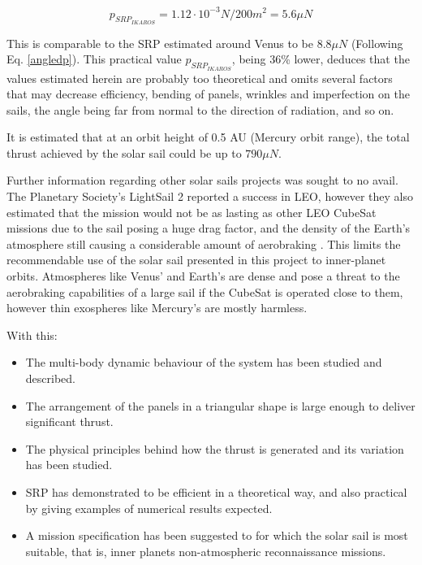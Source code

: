 \begin{equation}\label{Ikarossrp}
    p_{SRP_{IKAROS}} = 1.12 \cdot 10^{-3} N / 200 m^2 = 5.6 \mu N
\end{equation}

This is comparable to the SRP estimated around Venus to be $8.8 \mu N$ (Following Eq. \ref{angledp}). This practical value $p_{SRP_{IKAROS}}$, being 36\% lower, deduces that the values estimated herein are probably too theoretical and omits several factors that may decrease efficiency, bending of panels, wrinkles and imperfection on the sails, the angle being far from normal to the direction of radiation, and so on. 

It is estimated that at an orbit height of 0.5 AU (Mercury orbit range), the total thrust achieved by the solar sail could be up to $790 \mu N$.

Further information regarding other solar sails projects was sought to no avail. The Planetary Society's LightSail 2 reported a success in LEO, however they also estimated that the mission would not be as lasting as other LEO CubeSat missions due to the sail posing a huge drag factor, and the density of the Earth's atmosphere still causing a considerable amount of aerobraking \cite{planetary}. This limits the recommendable use of the solar sail presented in this project to inner-planet orbits. Atmospheres like Venus' and Earth's are dense and pose a threat to the aerobraking capabilities of a large sail if the CubeSat is operated close to them, however thin exospheres like Mercury's are mostly harmless.

With this:

\begin{itemize}
    \item The multi-body dynamic behaviour of the system has been studied and described.
    \item The arrangement of the panels in a triangular shape is large enough to deliver significant thrust.
    \item The physical principles behind how the thrust is generated and its variation has been studied.
    \item SRP has demonstrated to be efficient in a theoretical way, and also practical by giving examples of numerical results expected.
    \item A mission specification has been suggested to for which the solar sail is most suitable, that is, inner planets non-atmospheric reconnaissance missions.
\end{itemize}

